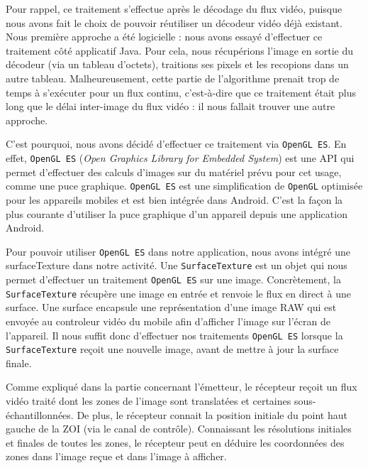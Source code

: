 \documentclass[11pt,a4paper]{article}
\begin{document}
\bigbreak
Pour rappel, ce traitement s'effectue après le décodage du flux vidéo, puisque nous avons fait le choix de pouvoir réutiliser un décodeur vidéo déjà existant.
Nous première approche a été logicielle : nous avons essayé d'effectuer ce traitement côté applicatif Java.
Pour cela, nous récupérions l'image en sortie du décodeur (via un tableau d'octets), traitions ses pixels et les recopions dans un autre tableau.
Malheureusement, cette partie de l'algorithme prenait trop de temps à s'exécuter pour un flux continu, c'est-à-dire que ce traitement était plus long que le délai inter-image du flux vidéo : il nous fallait trouver une autre approche.

\bigbreak
C'est pourquoi, nous avons décidé d'effectuer ce traitement via \texttt{OpenGL ES}.
En effet, \texttt{OpenGL ES} (\textit{Open Graphics Library for Embedded System}) est une API qui permet d'effectuer des calculs d'images sur du matériel prévu pour cet usage, comme une puce graphique. 
\texttt{OpenGL ES} est une simplification de \texttt{OpenGL} optimisée pour les appareils mobiles et est bien intégrée dans Android.
C'est la façon la plus courante d'utiliser la puce graphique d'un appareil depuis une application Android.

\bigbreak
Pour pouvoir utiliser \texttt{OpenGL ES} dans notre application, nous avons intégré une surfaceTexture dans notre activité.
Une \texttt{SurfaceTexture} est un objet qui nous permet d'effectuer un traitement \texttt{OpenGL ES} sur une image.
Concrètement, la \texttt{SurfaceTexture} récupère une image en entrée et renvoie le flux en direct à une surface.
Une surface encapsule une représentation d'une image RAW qui est envoyée au controleur vidéo du mobile afin d'afficher l'image sur l'écran de l'appareil.
Il nous suffit donc d'effectuer nos traitements \texttt{OpenGL ES} lorsque la \texttt{SurfaceTexture} reçoit une nouvelle image, avant de mettre à jour la surface finale.

\bigbreak
Comme expliqué dans la partie concernant l'émetteur, le récepteur reçoit un flux vidéo traité dont les zones de l'image sont translatées et certaines sous-échantillonnées.
De plus, le récepteur connait la position initiale du point haut gauche de la ZOI (via le canal de contrôle).
Connaissant les résolutions initiales et finales de toutes les zones, le récepteur peut en déduire les coordonnées des zones dans l'image reçue et dans l'image à afficher.
\end{document}
